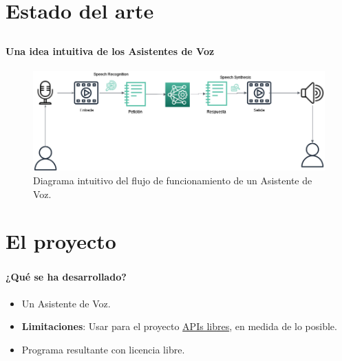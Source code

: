 \section{Estado del arte}

\subsection{}

\begin{frame}[fragile=singleslide]{\insertsectionhead}
  \framesubtitle{Una idea intuitiva de los Asistentes de Voz}
  \begin{figure}[H]
  	\includegraphics[width=\textwidth]{images/DiagramaIntuitivo.png}
  	\caption {Diagrama intuitivo del flujo de funcionamiento de un Asistente de Voz. \cite{sr-methods}}
  \end{figure}
  
\end{frame}

\section{El proyecto}

\begin{frame}
	\frametitle{\insertsectionhead}
	\framesubtitle{¿Qué se ha desarrollado?}
	\begin{itemize}
		\item Un Asistente de Voz.
		\item \textbf{Limitaciones}: Usar para el proyecto \underline{APIs libres}, en medida de lo posible.
		\item Programa resultante con licencia libre.
		
	\end{itemize}
\end{frame}




